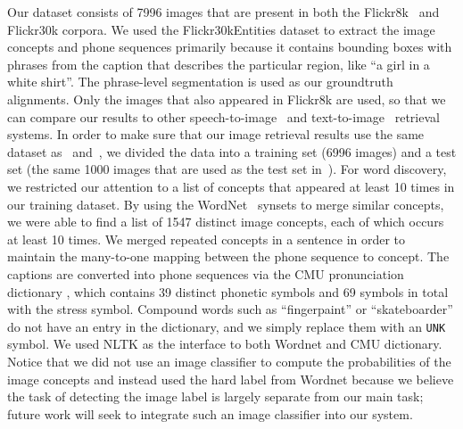 \documentclass[a4paper]{article}
\begin{document}
Our dataset consists of 7996 images that are present in both the Flickr8k~\cite{Hodosh2010} and Flickr30k corpora.
We used the Flickr30kEntities dataset to extract the image concepts and phone sequences primarily because it contains bounding boxes with phrases from the caption that describes the particular region, like ``a girl in a white shirt''.
The phrase-level segmentation is used as our groundtruth alignments.
Only the images
that also
appeared in Flickr8k are used,
so that we can compare our results to 
other speech-to-image~\cite{Harwath15} and text-to-image~\cite{Karpathy14} retrieval systems.
In order to make sure that our image retrieval results use the same dataset as~\cite{Harwath17}
and~\cite{Karpathy14}, we divided the data into a training set
(6996 images) and a test set (the same 1000 images that are used as the test set
in~\cite{Harwath17,Karpathy14}).
For word discovery, we 
restricted our attention to a list of concepts that appeared at least 10 times in our training dataset.
By using the WordNet~\cite{Miller1995} synsets to merge similar concepts, we were
able to find a list of 1547 distinct image concepts, each of which occurs at least 10 times.
We merged repeated concepts in a sentence in order to maintain the many-to-one mapping between the phone sequence to concept.
The captions are converted into phone sequences via the CMU pronunciation dictionary \cite{Rudnicky2014}, which contains 39 distinct phonetic symbols and 69 symbols in total with the stress symbol. Compound words such as ``fingerpaint'' or ``skateboarder'' do not have an entry in the dictionary, and we simply replace them with an \texttt{UNK} symbol.
We used NLTK \cite{BirdKleinLoper09} as the interface to both Wordnet and CMU dictionary.
Notice that we did not use an image classifier to compute the probabilities of the image concepts and instead used the hard label from Wordnet because we believe the task of detecting the image label is largely separate from our main task;
future work will seek
to integrate such an image classifier into our system. 
\end{document}
